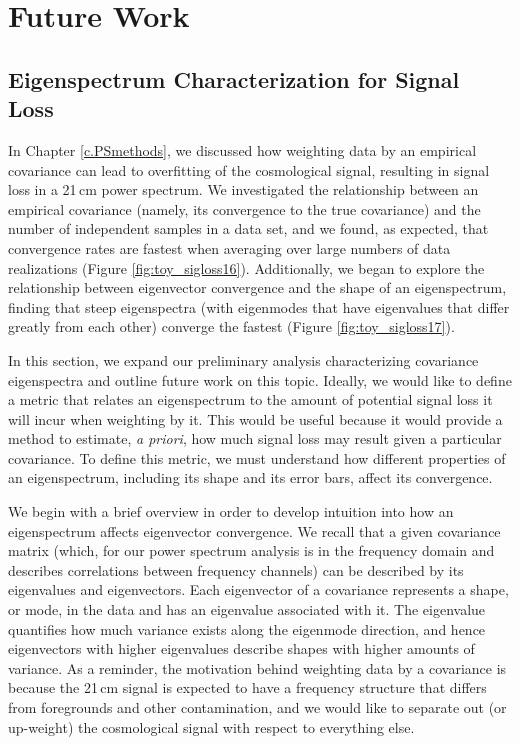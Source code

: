 \chapter{Future Work}
\label{c.future}

\section{Eigenspectrum Characterization for Signal Loss}

In Chapter \ref{c.PSmethods}, we discussed how weighting data by an empirical covariance can lead to overfitting of the cosmological signal, resulting in signal loss in a 21\,cm power spectrum. We investigated the relationship between an empirical covariance (namely, its convergence to the true covariance) and the number of independent samples in a data set, and we found, as expected, that convergence rates are fastest when averaging over large numbers of data realizations (Figure \ref{fig:toy_sigloss16}). Additionally, we began to explore the relationship between eigenvector convergence and the shape of an eigenspectrum, finding that steep eigenspectra (with eigenmodes that have eigenvalues that differ greatly from each other) converge the fastest (Figure \ref{fig:toy_sigloss17}).

In this section, we expand our preliminary analysis characterizing covariance eigenspectra and outline future work on this topic. Ideally, we would like to define a metric that relates an eigenspectrum to the amount of potential signal loss it will incur when weighting by it. This would be useful because it would provide a method to estimate, \textit{a priori}, how much signal loss may result given a particular covariance. To define this metric, we must understand how different properties of an eigenspectrum, including its shape and its error bars, affect its convergence. 

We begin with a brief overview in order to develop intuition into how an eigenspectrum affects eigenvector convergence. We recall that a given covariance matrix (which, for our power spectrum analysis is in the frequency domain and describes correlations between frequency channels) can be described by its eigenvalues and eigenvectors. Each eigenvector of a covariance represents a shape, or mode, in the data and has an eigenvalue associated with it. The eigenvalue quantifies how much variance exists along the eigenmode direction, and hence eigenvectors with higher eigenvalues describe shapes with higher amounts of variance. As a reminder, the motivation behind weighting data by a covariance is because the 21\,cm signal is expected to have a frequency structure that differs from foregrounds and other contamination, and we would like to separate out (or up-weight) the cosmological signal with respect to everything else.


